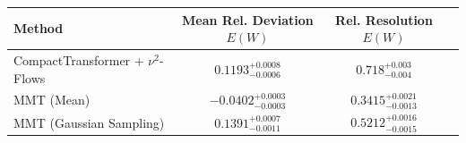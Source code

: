     \begin{tabular}{lccc}
        \toprule
        Method & Mean Rel. Deviation $E(W)$ & Rel. Resolution $E(W)$ \\
        \midrule
        CompactTransformer + $\nu^2$-Flows & $0.1193^{+0.0008}_{-0.0006}$ & $0.718^{+0.003}_{-0.004}$ \\
        MMT (Mean) & $-0.0402^{+0.0003}_{-0.0003}$ & $0.3415^{+0.0021}_{-0.0013}$ \\
        MMT (Gaussian Sampling) & $0.1391^{+0.0007}_{-0.0011}$ & $0.5212^{+0.0016}_{-0.0015}$ \\
        \bottomrule
    \end{tabular}